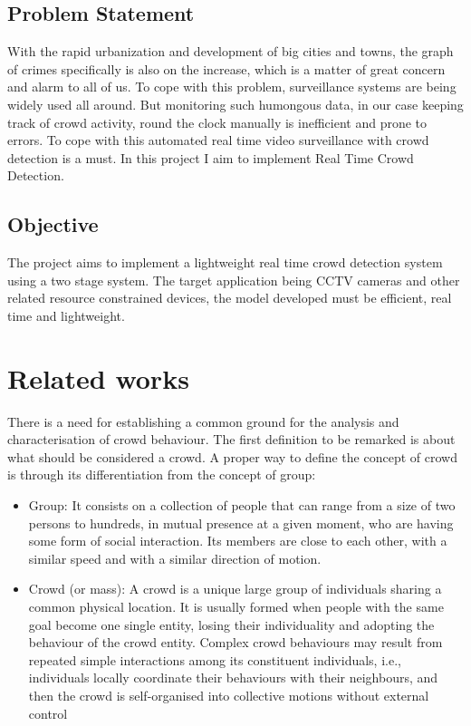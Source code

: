\documentclass{fisatprojectfinal}
\begin{document}
\section{Problem Statement}
With the rapid urbanization and development of big cities and towns, the graph of crimes specifically is also on the increase,  which is a matter of great concern and alarm to all of us. To cope with this problem, surveillance systems are being widely used all around. But monitoring such humongous data, in our case keeping track of crowd activity, round the clock manually is inefficient and prone to errors. To cope with this automated real time video surveillance with crowd detection is a must. In this project I aim to implement Real Time Crowd Detection. 

\section{Objective}

The project aims to implement a lightweight real time crowd detection system using a two stage system. The target application being CCTV cameras and other related resource constrained devices, the model developed must be efficient, real time and lightweight. 

\chapter{Related works}

There is a need for establishing a common ground for the analysis and characterisation of crowd behaviour. The first definition to be remarked is about what should be considered a crowd. A proper way to define the concept of crowd is through its differentiation from the concept of group:

\begin{itemize}
  \item Group: It consists on a collection of people that can range from a
size of two persons to hundreds, in mutual presence at a given moment, who are having some form of social interaction. Its members are close to each other, with a similar speed and with a similar direction of motion.
  \item Crowd (or mass): A crowd is a unique large group of individuals sharing a common physical location. It is usually formed when people with the same goal become one single entity, losing their individuality and adopting the behaviour of the crowd entity. Complex crowd behaviours may result from repeated simple interactions among its constituent individuals, i.e., individuals locally coordinate their behaviours with their neighbours, and then the crowd is self-organised into collective motions without external control
\end{itemize}
\end{document}
